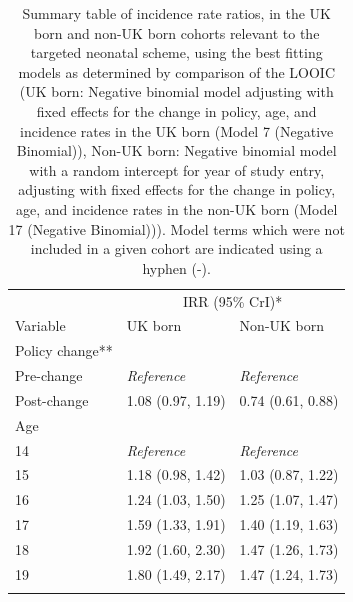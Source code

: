 \documentclass[11pt,twoside]{bristolthesis}
\begin{document}
  \begin{table}[!h]
  
  \caption[Summary table of incidence rate ratios, in the UK born and non-UK born cohorts relevant to the targeted neonatal scheme, using the best fitting models as determined by comparison of the LOOIC.]{\label{tab:07-universal-tab}Summary table of incidence rate ratios, in the UK born and non-UK born cohorts relevant to the targeted neonatal scheme, using the best fitting models as determined by comparison of the LOOIC (UK born: Negative binomial model adjusting with fixed effects for the change in policy, age, and incidence rates in the UK born (Model 7 (Negative Binomial)), Non-UK born: Negative binomial model with a random intercept for year of study entry, adjusting with fixed effects for the change in policy, age, and incidence rates in the non-UK born (Model 17 (Negative Binomial))). Model terms which were not included in a given cohort are indicated using a hyphen (-).}
  \centering
  \fontsize{8}{10}\selectfont
  \begin{tabular}{lll}
  \toprule
  \multicolumn{1}{c}{ } & \multicolumn{2}{c}{IRR (95\% CrI)*} \\
  \cmidrule(l{3pt}r{3pt}){2-3}
  Variable & UK born & Non-UK born\\
  \midrule
  Policy change** &  & \\
  \hspace{1em}Pre-change & \em{Reference} & \em{Reference}\\
  \hspace{1em}Post-change & 1.08 (0.97, 1.19) & 0.74 (0.61, 0.88)\\
  Age &  & \\
  \hspace{1em}14 & \em{Reference} & \em{Reference}\\
  \addlinespace
  \hspace{1em}15 & 1.18 (0.98, 1.42) & 1.03 (0.87, 1.22)\\
  \hspace{1em}16 & 1.24 (1.03, 1.50) & 1.25 (1.07, 1.47)\\
  \hspace{1em}17 & 1.59 (1.33, 1.91) & 1.40 (1.19, 1.63)\\
  \hspace{1em}18 & 1.92 (1.60, 2.30) & 1.47 (1.26, 1.73)\\
  \hspace{1em}19 & 1.80 (1.49, 2.17) & 1.47 (1.24, 1.73)\\
  \addlinespace

\end{tabular}
\end{table}
\end{document}
